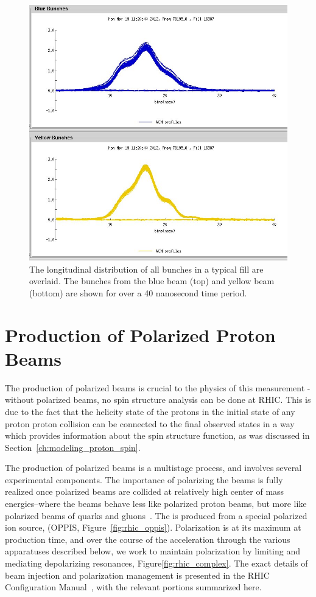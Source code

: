 \begin{figure}
  \centering
  \includegraphics[width=0.7\linewidth]{./figures/wcm_16587.jpeg}
  \caption{
		The longitudinal distribution of all bunches in a typical fill are overlaid.
		The bunches from the blue beam (top) and yellow beam (bottom) are shown for
		over a 40 nanosecond time period. 
  }
  \label{fig:bunch_profile_overlay}
\end{figure}

\clearpage
\section{Production of Polarized Proton Beams}

The production of polarized beams is crucial to the physics of this measurement
- without polarized beams, no spin structure analysis can be done at RHIC. This
is due to the fact that the helicity state of the protons in the initial state
of any proton proton collision can be connected to the final observed states in
a way which provides information about the spin structure function, as was
discussed in Section~\ref{ch:modeling_proton_spin}. 

The production of polarized beams is a multistage process, and involves several
experimental components. The importance of polarizing the beams is fully
realized once polarized beams are collided at relatively high center of mass
energies--where the beams behave less like polarized proton beams, but more like
polarized beams of quarks and gluons~\cite{Alekseev2003}. The is produced from a
special polarized ion source, (OPPIS, Figure~\ref{fig:rhic_oppis}). Polarization
is at its maximum at production time, and over the course of the acceleration
through the various apparatuses described below, we work to maintain
polarization by limiting and mediating depolarizing resonances,
Figure\ref{fig:rhic_complex}. The exact details of beam injection and
polarization management is presented in the RHIC Configuration
Manual~\cite{RHIC2006}, with the relevant portions summarized here.

